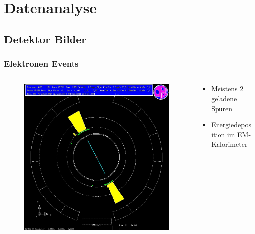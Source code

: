 \section{Datenanalyse}
\subsection{Detektor Bilder}
\begin{frame}
	\frametitle{Elektronen Events}
	\begin{columns}[T] %
		\begin{column}{.54\textwidth}
			\begin{figure}
				\centering
				\includegraphics[width=1.0\linewidth]{graphics/electronopal}
			\end{figure}
		\end{column}%
		\hfill%
		\begin{column}{.42\textwidth}
			\begin{center}
				\begin{itemize}
					\item Meistens 2 geladene Spuren
					\item Energiedeposition im EM-Kalorimeter
				\end{itemize}
			\end{center}
		\end{column}%
	\end{columns}
\end{frame}

